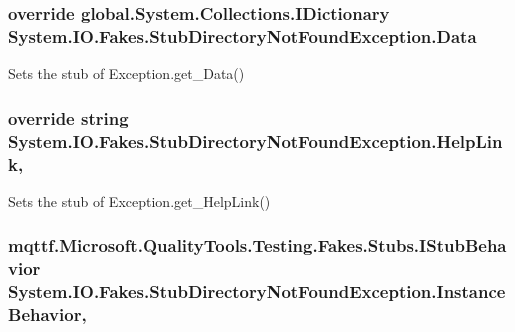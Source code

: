 \hypertarget{class_system_1_1_i_o_1_1_fakes_1_1_stub_directory_not_found_exception_a836b203bc46b91527104e8d7605df870}{
\subsubsection[{Data}]{\setlength{\rightskip}{0pt plus 5cm}override global.\-System.\-Collections.\-I\-Dictionary System.\-I\-O.\-Fakes.\-Stub\-Directory\-Not\-Found\-Exception.\-Data\hspace{0.3cm}{\ttfamily [get]}}}\label{class_system_1_1_i_o_1_1_fakes_1_1_stub_directory_not_found_exception_a836b203bc46b91527104e8d7605df870}


Sets the stub of Exception.\-get\-\_\-\-Data()

\hypertarget{class_system_1_1_i_o_1_1_fakes_1_1_stub_directory_not_found_exception_a4431b38b6921f0ccd7b1cd85c6ac89be}{
\subsubsection[{Help\-Link}]{\setlength{\rightskip}{0pt plus 5cm}override string System.\-I\-O.\-Fakes.\-Stub\-Directory\-Not\-Found\-Exception.\-Help\-Link\hspace{0.3cm}{\ttfamily [get]}, {\ttfamily [set]}}}\label{class_system_1_1_i_o_1_1_fakes_1_1_stub_directory_not_found_exception_a4431b38b6921f0ccd7b1cd85c6ac89be}


Sets the stub of Exception.\-get\-\_\-\-Help\-Link()

\hypertarget{class_system_1_1_i_o_1_1_fakes_1_1_stub_directory_not_found_exception_ac5b0ad19d012b320b4626195d7c51245}{
\subsubsection[{Instance\-Behavior}]{\setlength{\rightskip}{0pt plus 5cm}mqttf.\-Microsoft.\-Quality\-Tools.\-Testing.\-Fakes.\-Stubs.\-I\-Stub\-Behavior System.\-I\-O.\-Fakes.\-Stub\-Directory\-Not\-Found\-Exception.\-Instance\-Behavior\hspace{0.3cm}{\ttfamily [get]}, {\ttfamily [set]}}}\label{class_system_1_1_i_o_1_1_fakes_1_1_stub_directory_not_found_exception_ac5b0ad19d012b320b4626195d7c51245}


